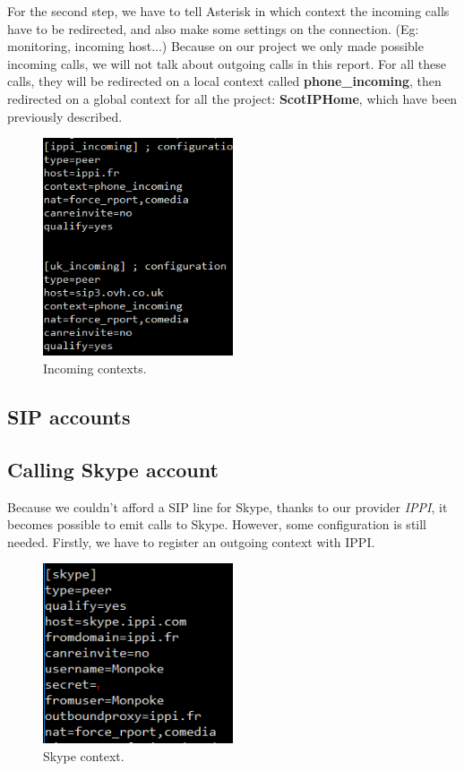 For the second step, we have to tell Asterisk in which context the incoming calls have to be redirected, and also make some settings on the connection. (Eg: monitoring, incoming host...)
Because on our project we only made possible incoming calls, we will not talk about outgoing calls in this report. For all these calls, they will be redirected on a local context called \textbf{phone\_incoming}, then redirected on a global context for all the project: \textbf{ScotIPHome}, which have been previously described.

\begin{figure}[!ht]
  \caption{Incoming contexts.}
  \centering
    \includegraphics[width=0.5\textwidth]{img/contextsphones.png}
\end{figure}

\subsection{SIP accounts}


\subsection{Calling Skype account}
Because we couldn't afford a SIP line for Skype, thanks to our provider \textit{IPPI}, it becomes possible to emit calls to Skype. However, some configuration is still needed. Firstly, we have to register an outgoing context with IPPI.

\begin{figure}[!ht]
  \caption{Skype context.}
  \centering
    \includegraphics[width=0.5\textwidth]{img/skypeout.png}
\end{figure}

